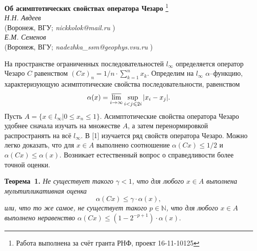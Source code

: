 \documentclass[a5paper,12pt,openbib]{report}
\begin{document}



\begin{center}{ \bf  Об асимптотических свойствах оператора Чезаро}%
\footnote{Работа выполнена за счёт гранта РНФ, проект 16-11-10125}
\\
{\it Н.Н. Авдеев } \\
(Воронеж, ВГУ; {\it nickkolok@mail.ru} ) \\
{\it Е.М. Семенов } \\
(Воронеж, ВГУ; {\it nadezhka\_ssm@geophys.vsu.ru}
)
\end{center}


\setcounter{equation}{0}


На пространстве ограниченных последовательностей $l_\infty$ определяется оператор Чезаро $C$
равенством
$
	(Cx)_n = {1}/{n} \cdot \sum_{k=1}^n x_k.
$
Определим на $l_\infty$ $\alpha$--функцию,
характеризующую асимптотические свойства последовательности,
равенством
$$
	\alpha(x) = \varlimsup_{i\to\infty}\sup_{i < j \leqslant 2i} |x_i - x_j|.
$$
Пусть $A = \{x\in l_\infty | 0 \leqslant x_n \leqslant 1\}$.
Асимптотические свойства оператора Чезаро удобнее сначала изучать на множестве $A$,
а затем перенормировкой распространять на всё $l_\infty$.
В [1] изучается ряд свойств оператора Чезаро.
Можно легко доказать, что для $x\in A$ выполнено соотношение $\alpha(Cx) \leqslant 1/2$
и $\alpha(Cx) \leqslant \alpha(x)$.
Возникает естественный вопрос о справедливости более точной оценки.

\textbf{Теорема~1.}
{\it
	Не существует такого $\gamma < 1$,
	что для любого $x\in A$ выполнена мультипликативная оценка
	$$
		\alpha(Cx) \leqslant \gamma \cdot \alpha(x)
	,
	$$
или, что то же самое, не существует такого $p\in \mathbb{N}$,
	что для любого $x\in A$ выполнено неравенство
	$
		\alpha(Cx) \leqslant (1-2^{-p+1})\cdot \alpha(x).
	$
}
\end{document}
